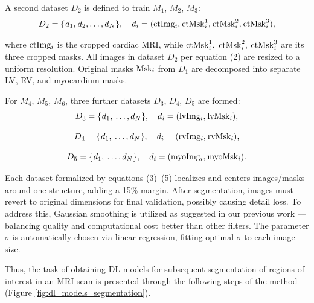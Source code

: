 \documentclass[fleqn,10pt]{wlscirep}
\begin{document}
A second dataset \({D_2}\) is defined to train \({M_1}\), \({M_2}\), \({M_3}\):
\begin{equation}
    {D_2} = \{ {\mkern 1mu} {d_1},{\mkern 1mu} {d_2}, \ldots ,{d_N}\} ,\quad {d_i} = ({\rm{ctIm}}{{\rm{g}}_i},{\mkern 1mu} {\rm{ctMsk}}_i^1,{\mkern 1mu} {\rm{ctMsk}}_i^2,{\mkern 1mu} {\rm{ctMsk}}_i^3),
\end{equation}

where \({\rm{ctIm}}{{\rm{g}}_i}\) is the cropped cardiac MRI, while \({\rm{ctMsk}}_i^1,\) \({\rm{ctMsk}}_i^2,\) \({\rm{ctMsk}}_i^3\) are its three cropped masks.
All images in dataset \({D_2}\) per equation (2) are resized to a uniform resolution. Original masks \({\rm{Ms}}{{\rm{k}}_i}\) from \({D_1}\) are decomposed into separate LV, RV, and myocardium masks.

For \({M_4}\), \({M_5}\), \({M_6}\), three further datasets \({D_3}\), \({D_4}\), \({D_5}\) are formed:
\begin{equation}
    {D_3} = \{ {\mkern 1mu} {d_1},{\mkern 1mu} \ldots ,{d_N}\} ,\quad {d_i} = ({\rm{lvIm}}{{\rm{g}}_i},{\mkern 1mu} {\rm{lvMs}}{{\rm{k}}_i}),
\end{equation}

\begin{equation}
    {D_4} = \{ {\mkern 1mu} {d_1},{\mkern 1mu} \ldots ,{d_N}\} ,\quad {d_i} = ({\rm{rvIm}}{{\rm{g}}_i},{\mkern 1mu} {\rm{rvMs}}{{\rm{k}}_i}),
\end{equation}

\begin{equation}
    {D_5} = \{ {\mkern 1mu} {d_1},{\mkern 1mu} \ldots ,{d_N}\} ,\quad {d_i} = ({\rm{myoIm}}{{\rm{g}}_i},{\mkern 1mu} {\rm{myoMs}}{{\rm{k}}_i}).
\end{equation}

Each dataset formalized by equations (3)–(5) localizes and centers images/masks around one structure, adding a 15\% margin. After segmentation, images must revert to original dimensions for final validation, possibly causing detail loss. To address this, Gaussian smoothing is utilized as suggested in our previous work \cite{Slobodzian:2024}—balancing quality and computational cost better than other filters. The parameter \(\sigma \) is automatically chosen via linear regression, fitting optimal \(\sigma \) to each image size.

Thus, the task of obtaining DL models for subsequent segmentation of regions of interest in an MRI scan is presented through the following steps of the method (Figure \ref{fig:dl_models_segmentation}).
\end{document}

